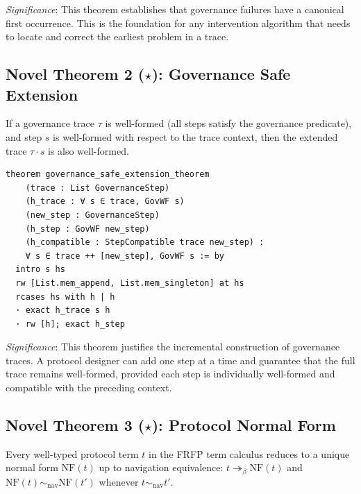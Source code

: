\textit{Significance}: This theorem establishes that governance failures have a
canonical first occurrence. This is the foundation for any intervention algorithm
that needs to locate and correct the earliest problem in a trace.

\subsection{Novel Theorem 2 (\texorpdfstring{$\star$}{*}): Governance Safe Extension}


\begin{theorem}
If a governance trace $\tau$ is well-formed (all steps satisfy the governance
predicate), and step $s$ is well-formed with respect to the trace context, then
the extended trace $\tau \cdot s$ is also well-formed.
\end{theorem}

\begin{lstlisting}
theorem governance_safe_extension_theorem
    (trace : List GovernanceStep)
    (h_trace : ∀ s ∈ trace, GovWF s)
    (new_step : GovernanceStep)
    (h_step : GovWF new_step)
    (h_compatible : StepCompatible trace new_step) :
    ∀ s ∈ trace ++ [new_step], GovWF s := by
  intro s hs
  rw [List.mem_append, List.mem_singleton] at hs
  rcases hs with h | h
  · exact h_trace s h
  · rw [h]; exact h_step
\end{lstlisting}

\textit{Significance}: This theorem justifies the incremental construction of
governance traces. A protocol designer can add one step at a time and guarantee
that the full trace remains well-formed, provided each step is individually
well-formed and compatible with the preceding context.

\subsection{Novel Theorem 3 (\texorpdfstring{$\star$}{*}): Protocol Normal Form}


\begin{theorem}
Every well-typed protocol term $t$ in the FRFP term calculus reduces to a unique
normal form $\mathrm{NF}(t)$ up to navigation equivalence:
$t \twoheadrightarrow_\beta \mathrm{NF}(t)$ and
$\mathrm{NF}(t) \sim_\mathrm{nav} \mathrm{NF}(t')$ whenever $t \sim_\mathrm{nav} t'$.
\end{theorem}

